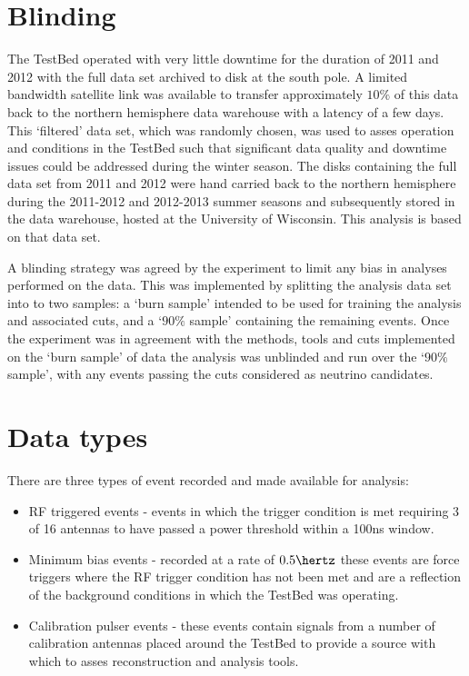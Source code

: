 \section{Blinding}
\label{sec:Analysis:Blinding}
The TestBed operated with very little downtime for the duration of 2011 and 2012 with the full data set archived to disk at the south pole. A limited bandwidth satellite link was available to transfer approximately $10 \%$ of this data back to the northern hemisphere data warehouse with a latency of a few days. This `filtered' data set, which was randomly chosen, was used to asses operation and conditions in the TestBed such that significant data quality and downtime issues could be addressed during the winter season. The disks containing the full data set from 2011 and 2012 were hand carried back to the northern hemisphere during the 2011-2012 and 2012-2013 summer seasons and subsequently stored in the data warehouse, hosted at the University of Wisconsin. This analysis is based on that data set.

A blinding strategy was agreed by the experiment to limit any bias in analyses performed on the data. This was implemented by splitting the analysis data set into to two samples: a `burn sample' intended to be used for training the analysis and associated cuts, and a `$90 \%$ sample' containing the remaining events. Once the experiment was in agreement with the methods, tools and cuts implemented on the `burn sample' of data the analysis was unblinded and run over the `$90 \%$ sample', with any events passing the cuts considered as neutrino candidates.

\section{Data types}
\label{sec:Analysis:Data-types}

There are three types of event recorded and made available for analysis:

\begin{itemize}

\item RF triggered events - events in which the trigger condition is met requiring 3 of 16 antennas to have passed a power threshold within a 100ns window.
\item Minimum bias events - recorded at a rate of $0.5 \hertz$ these events are force triggers where the RF trigger condition has not been met and are a reflection of the background conditions in which the TestBed was operating.
\item Calibration pulser events - these events contain signals from a number of calibration antennas placed around the TestBed to provide a source with which to asses reconstruction and analysis tools.

\end{itemize}


